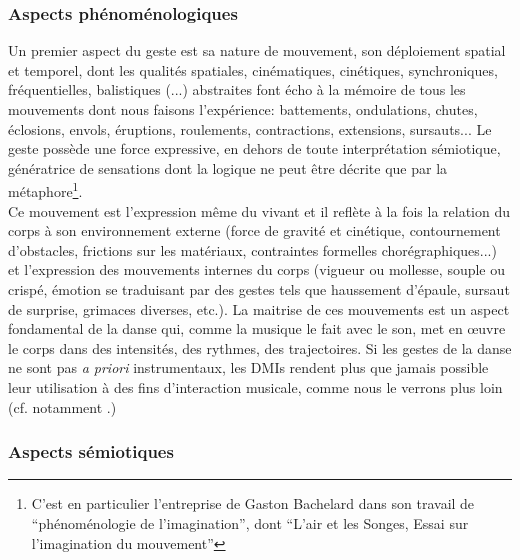 \subsubsection{Aspects phénoménologiques}

\noindent Un premier aspect du geste est sa nature de mouvement, son déploiement spatial et temporel, dont les qualités spatiales, cinématiques, cinétiques, synchroniques, fréquentielles, balistiques (...) abstraites font écho à la mémoire de tous les mouvements dont nous faisons l'expérience: battements, ondulations, chutes, éclosions, envols, éruptions, roulements, contractions, extensions, sursauts... Le geste possède une force expressive, en dehors de toute interprétation sémiotique, génératrice de sensations dont la logique ne peut être décrite que par la métaphore\footnote{C'est en particulier l'entreprise de Gaston Bachelard dans son travail de ``phénoménologie de l'imagination'', dont ``L'air et les Songes, Essai sur l'imagination du mouvement''\cite{bachelard_air_1943}}.\\
\indent Ce mouvement est l'expression même du vivant et il reflète à la fois la relation du corps à son environnement externe (force de gravité et cinétique, contournement d'obstacles, frictions sur les matériaux, contraintes formelles chorégraphiques...) et l'expression des mouvements internes du corps (vigueur ou mollesse, souple ou crispé, émotion se traduisant par des gestes tels que haussement d'épaule, sursaut de surprise, grimaces diverses, etc.). La maitrise de ces mouvements est un aspect fondamental de la danse qui, comme la musique le fait avec le son, met en œuvre le corps dans des intensités, des rythmes, des trajectoires. Si les gestes de la danse ne sont pas \textit{a priori} instrumentaux, les \glspl{DMI} rendent plus que jamais possible leur utilisation à des fins d'interaction musicale, comme nous le verrons plus loin (cf. notamment \cite{bevilacqua_gesture_2011, alaoui_movement_2012, silang_maranan_designing_2014, hsueh_understanding_2019}.)

\subsubsection{Aspects sémiotiques}

